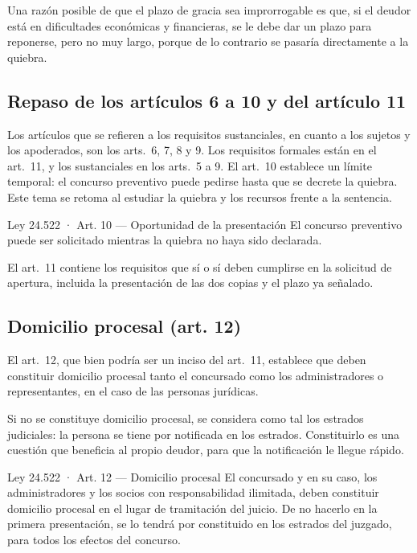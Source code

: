 \documentclass[12pt,oneside]{book}
\begin{document}
Una razón posible de que el plazo de gracia sea improrrogable es que, si el deudor está en dificultades económicas y financieras, se le debe dar un plazo para reponerse, pero no muy largo, porque de lo contrario se pasaría directamente a la quiebra.

\subsection{Repaso de los artículos 6 a 10 y del artículo 11}

Los artículos que se refieren a los requisitos sustanciales, en cuanto a los sujetos y los apoderados, son los arts.~6, 7, 8 y 9. Los requisitos formales están en el art.~11, y los sustanciales en los arts.~5 a 9. El art.~10 establece un límite temporal: el concurso preventivo puede pedirse hasta que se decrete la quiebra. Este tema se retoma al estudiar la quiebra y los recursos frente a la sentencia.

\begin{norma}{Ley 24.522 · Art. 10 — Oportunidad de la presentación}
El concurso preventivo puede ser solicitado mientras la quiebra no haya sido declarada.
\end{norma}

El art.~11 contiene los requisitos que sí o sí deben cumplirse en la solicitud de apertura, incluida la presentación de las dos copias y el plazo ya señalado.

\subsection{Domicilio procesal (art. 12)}

El art.~12, que bien podría ser un inciso del art.~11, establece que deben constituir domicilio procesal tanto el concursado como los administradores o representantes, en el caso de las personas jurídicas.

Si no se constituye domicilio procesal, se considera como tal los estrados judiciales: la persona se tiene por notificada en los estrados. Constituirlo es una cuestión que beneficia al propio deudor, para que la notificación le llegue rápido.

\begin{norma}{Ley 24.522 · Art. 12 — Domicilio procesal}
El concursado y en su caso, los administradores y los socios con responsabilidad ilimitada, deben constituir domicilio procesal en el lugar de tramitación del juicio. De no hacerlo en la primera presentación, se lo tendrá por constituido en los estrados del juzgado, para todos los efectos del concurso.
\end{norma}
\end{document}
